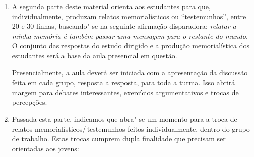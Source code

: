 \documentclass[11pt]{extarticle}
\begin{document}
\begin{enumerate}
\begin{itemize}
\item ``Como você descreveria as demais
personagens deste testemunho, e seu estilo de vida?''

\item ``Como você
compararia os rituais vivenciados na prisão, com os rituais vivenciados
no espaço escolar?''

\item ``Qual o papel da literatura de testemunho e da
literatura de memória para as sociedades e qual o seu impacto para a
análise histórica?''

\item ``O autor tem um estilo de realizar boa parte de
suas narrativas descritivas, você saberia analisá"-lo?''

\item ``Quais os
principais elementos da narrativa de Igor que te afetaram ou despertaram
reflexões interessantes?''

\item ``No desfecho desta narrativa, as reflexões
apontadas pelo autor"-personagem indicam pessimismo ou otimismo com
relação a sua vida e a história mais ampla da sociedade em que vivemos?
Justifique sua resposta.'' 
\end{itemize}

Ressaltamos que nesta parte da atividade o
grupo de estudantes precisa debater as questões para registrar suas
respostas, cabendo a possibilidade de registro das divergências de
ideias entre os integrantes.

\item A segunda parte deste material orienta aos estudantes para que,
individualmente, produzam relatos memorialísticos ou ``testemunhos'',
entre 20 e 30 linhas, baseando"-se na seguinte afirmação disparadora:
\emph{relatar a minha memória é também passar uma mensagem para o restante do
mundo}. O conjunto das respostas do estudo dirigido e a produção
memorialística dos estudantes será a base da aula presencial em questão.

Presencialmente, a aula deverá ser iniciada com a apresentação da
discussão feita em cada grupo, resposta a resposta, para toda a turma.
Isso abrirá margem para debates interessantes, exercícios argumentativos
e trocas de percepções. 

\item Passada esta parte, indicamos que abra"-se um
momento para a troca de relatos memorialísticos/\,testemunhos feitos
individualmente, dentro do grupo de trabalho. Estas trocas cumprem dupla
finalidade que precisam ser orientadas aos jovens: 


\end{enumerate}
\end{document}
